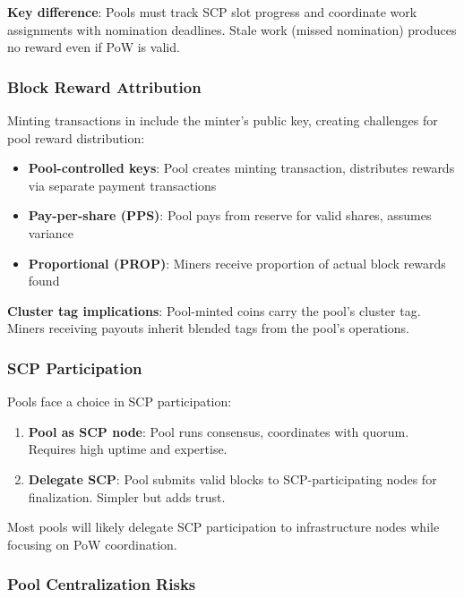 \textbf{Key difference}: Pools must track SCP slot progress and coordinate
work assignments with nomination deadlines. Stale work (missed nomination)
produces no reward even if PoW is valid.

\subsubsection{Block Reward Attribution}

Minting transactions in \Botho include the minter's public key, creating
challenges for pool reward distribution:

\begin{itemize}
  \item \textbf{Pool-controlled keys}: Pool creates minting transaction,
    distributes rewards via separate payment transactions
  \item \textbf{Pay-per-share (PPS)}: Pool pays from reserve for valid shares,
    assumes variance
  \item \textbf{Proportional (PROP)}: Miners receive proportion of actual
    block rewards found
\end{itemize}

\textbf{Cluster tag implications}: Pool-minted coins carry the pool's cluster
tag. Miners receiving payouts inherit blended tags from the pool's operations.

\subsubsection{SCP Participation}

Pools face a choice in SCP participation:

\begin{enumerate}
  \item \textbf{Pool as SCP node}: Pool runs consensus, coordinates with
    quorum. Requires high uptime and expertise.
  \item \textbf{Delegate SCP}: Pool submits valid blocks to SCP-participating
    nodes for finalization. Simpler but adds trust.
\end{enumerate}

Most pools will likely delegate SCP participation to infrastructure nodes
while focusing on PoW coordination.

\subsubsection{Pool Centralization Risks}


